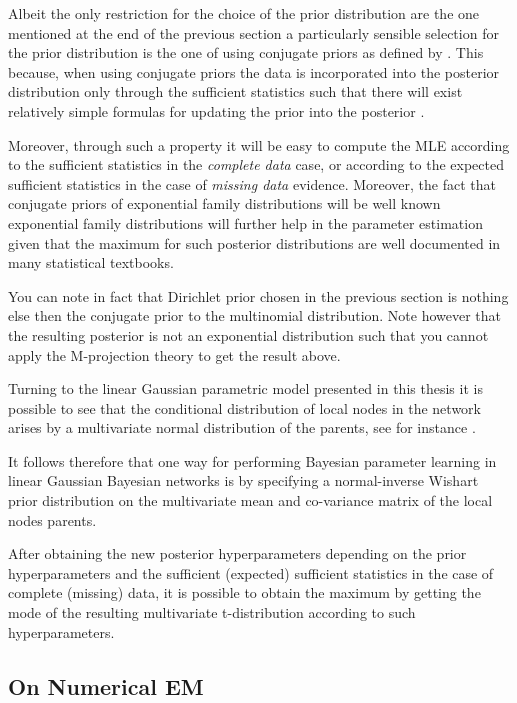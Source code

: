 \documentclass[11pt]{article}
\begin{document}
\begin{article}
Albeit the only restriction for the choice of the prior
distribution are the one mentioned at the end of the previous
section a particularly sensible selection for the prior
distribution is the one of using conjugate priors as defined by
\cite{schlaifer1961applied}. This because, when using conjugate
priors the data is incorporated into the posterior distribution
only through the sufficient statistics such that there will exist
relatively simple formulas for updating the prior into the
posterior \cite{fink1997compendium}.

Moreover, through such a property it will be easy to compute the
MLE according to the sufficient statistics in the \emph{complete data}
case, or according to the expected sufficient statistics in the
case of \emph{missing data} evidence. Moreover, the fact that conjugate
priors of exponential family distributions will be well known
exponential family distributions will further help in the
parameter estimation given that the maximum for such posterior
distributions are well documented in many statistical textbooks.

You can note in fact that Dirichlet prior chosen in the previous
section is nothing else then the conjugate prior to the
multinomial distribution. Note however that the resulting
posterior is not an exponential distribution such that you cannot
apply the M-projection theory to get the result above.

Turning to the linear Gaussian parametric model presented in this
thesis it is possible to see that the conditional distribution of
local nodes in the network arises by a multivariate normal
distribution of the parents, see for instance
\cite{koller2009probabilistic}.

It follows therefore that one way for performing Bayesian
parameter learning in linear Gaussian Bayesian networks is by
specifying a normal-inverse Wishart prior distribution on the
multivariate mean and co-variance matrix of the local nodes
parents.

After obtaining the new posterior hyperparameters depending on the
prior hyperparameters and the sufficient (expected) sufficient
statistics in the case of complete (missing) data, it is possible
to obtain the maximum by getting the mode of the resulting
multivariate t-distribution according to such hyperparameters.

\subsection{On Numerical EM}
\label{sec:org776d370}


\end{article}
\end{document}
